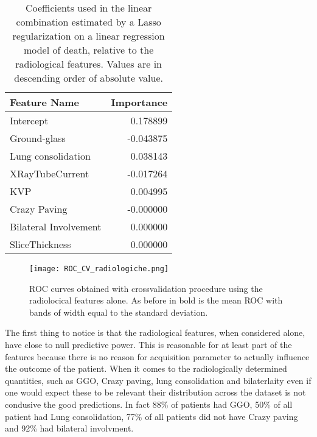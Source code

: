 \begin{table}
	\caption{Coefficients used in the linear combination estimated by a Lasso regularization on a linear regression model of death, relative to the radiological features. Values are in descending order of absolute value. \label{tab:ParamRadiologiche}}
		\centering
			\begin{tabular}{lr}
			\toprule
			Feature Name &  Importance \\
			\midrule
			Intercept             &                      0.178899 \\
			Ground-glass          &                     -0.043875 \\
			Lung consolidation    &                      0.038143 \\
			XRayTubeCurrent       &                     -0.017264 \\
			KVP                   &                      0.004995 \\
			Crazy Paving          &                     -0.000000 \\
			Bilateral Involvement &                      0.000000 \\
			SliceThickness        &                      0.000000 \\
			\bottomrule
			\end{tabular}
\end{table}

\begin{figure}[htbp]
	\centering
  		\texttt{[image: ROC\_CV\_radiologiche.png]}
        \caption{ROC curves obtained with crossvalidation procedure using the radiolocical features alone. As before  in bold is the mean ROC with bands of width equal to the standard deviation.\label{fig:RocDeathRadiologiche}}
\end{figure}

The first thing to notice is that the radiological features, when considered alone, have close to null predictive power. 
This is reasonable for at least part of the features because there is no reason for acquisition parameter to actually influence the outcome of the patient. 
 When it comes to the radiologically determined quantities, such as GGO, Crazy paving, lung consolidation and bilaterlaity even if one would expect these to be relevant their distribution across the dataset is not condusive the good predictions.
 In fact 88\% of patients had GGO, 50\% of all patient had Lung consolidation, 77\% of all patients did not have Crazy paving and 92\% had bilateral involvment.

